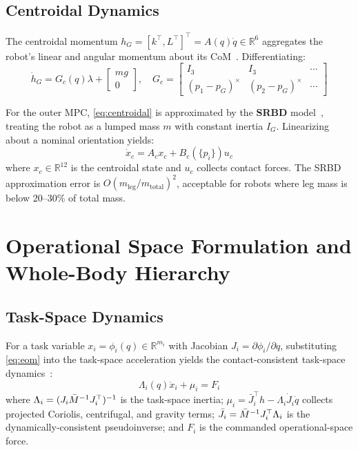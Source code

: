 \subsection{Centroidal Dynamics}

The centroidal momentum $h_G=[k^\top,L^\top]^\top=A(q)\dot{q}\in\mathbb{R}^6$
aggregates the robot's linear and angular momentum about its
CoM~\cite{orin2013centroidal}. Differentiating:
\begin{equation}\label{eq:centroidal}
  \dot{h}_G = G_c(q)\lambda + \begin{bmatrix}mg \\ 0\end{bmatrix},
  \quad
  G_c = \begin{bmatrix}I_3 & I_3 & \cdots \\
                       (p_1{-}p_G)^\times & (p_2{-}p_G)^\times & \cdots\end{bmatrix}
\end{equation}

For the outer MPC, \eqref{eq:centroidal} is approximated by the
\textbf{SRBD} model~\cite{dicarlo2018dynamic}, treating the robot as a
lumped mass $m$ with constant inertia $I_G$. Linearizing about a nominal
orientation yields:
\begin{equation}\label{eq:SRBD}
  \dot{x}_c = A_c x_c + B_c(\{p_i\})u_c
\end{equation}
where $x_c\in\mathbb{R}^{12}$ is the centroidal state and $u_c$ collects
contact forces. The SRBD approximation error is
$O(m_{\text{leg}}/m_{\text{total}})^2$, acceptable for robots where leg
mass is below 20--30\% of total mass.

\section{Operational Space Formulation and Whole-Body Hierarchy}
\label{sec:osf}

\subsection{Task-Space Dynamics}

For a task variable $x_i=\phi_i(q)\in\mathbb{R}^{m_i}$ with Jacobian
$J_i=\partial\phi_i/\partial q$, substituting \eqref{eq:eom} into the
task-space acceleration yields the contact-consistent task-space
dynamics~\cite{khatib1987unified,righetti2011inverse}:
\begin{equation}\label{eq:taskdyn}
  \Lambda_i(q)\ddot{x}_i + \mu_i = F_i
\end{equation}
where $\Lambda_i=(J_i\bar{M}^{-1} J_i^\top)^{-1}$ is the task-space inertia;
$\mu_i=\bar{J}_i^\top h - \Lambda_i\dot{J}_i\dot{q}$ collects projected
Coriolis, centrifugal, and gravity terms; $\bar{J}_i=\bar{M}^{-1} J_i^\top\Lambda_i$
is the dynamically-consistent pseudoinverse; and $F_i$ is the commanded
operational-space force.


